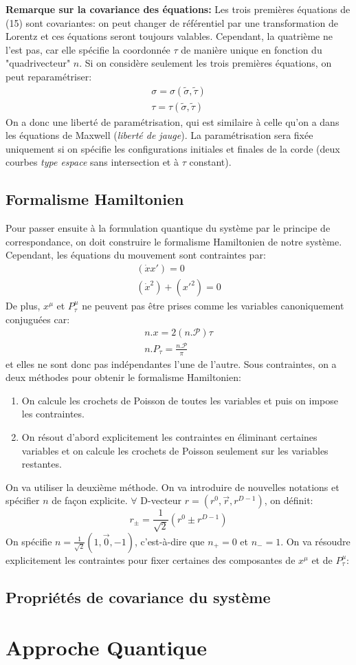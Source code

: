 \documentclass[a4paper,12pt]{article}
\def\xmu{x^\mu}
\begin{document}
\textbf{Remarque sur la covariance des équations:}
Les trois premières équations de (15) sont covariantes: on peut changer de référentiel par une transformation de Lorentz et ces équations seront toujours valables. Cependant, la quatrième ne l'est pas, car elle spécifie la coordonnée $\tau$ de manière unique en fonction du "quadrivecteur" $n$. 
Si on considère seulement les trois premières équations, on peut reparamétriser:
\begin{align}
\sigma=\sigma(\tilde{\sigma},\tilde{\tau})\\
\tau=\tau(\tilde{\sigma},\tilde{\tau})
\end{align}
On a donc une liberté de paramétrisation, qui est similaire à celle qu'on a dans les équations de Maxwell (\textit{liberté de jauge}). La paramétrisation sera fixée uniquement si on spécifie les configurations initiales et finales de la corde (deux courbes \textit{type espace} sans intersection et à $\tau$ constant).
\subsection{Formalisme Hamiltonien}
Pour passer ensuite à la formulation quantique du système par le principe de correspondance, on doit construire le formalisme Hamiltonien de notre système. Cependant, les équations du mouvement sont contraintes par:
\begin{align}
(\dot{x}x')=0\\
(\dot{x}^2)+(x'^2)=0
\end{align}
De plus, $\xmu$ et $P_\tau^\mu$ ne peuvent pas être prises comme les variables canoniquement conjuguées car:
\begin{align}
n.x=2(n.\mathcal{P})\tau\\
n.P_\tau=\frac{n.\mathcal{P}}{\pi}
\end{align}
et elles ne sont donc pas indépendantes l'une de l'autre. Sous contraintes, on a deux méthodes pour obtenir le formalisme Hamiltonien:
\begin{enumerate}
\item On calcule les crochets de Poisson de toutes les variables et puis on impose les contraintes.
\item On résout d'abord explicitement les contraintes en éliminant certaines variables et on calcule les crochets de Poisson seulement sur les variables restantes.
\end{enumerate} 
On va utiliser la deuxième méthode.
On va introduire de nouvelles notations et spécifier $n$ de façon explicite.
$\forall$ D-vecteur $r=(r^0,\vec{r},r^{D-1})$, on définit:
$$r_\pm=\frac{1}{\sqrt2}(r^0\pm r^{D-1})$$
On spécifie $n=\frac{1}{\sqrt2}(1,\vec{0},-1)$, c'est-à-dire que 
$n_+=0$ et $n_-=1$.
On va résoudre explicitement les contraintes pour fixer certaines des composantes de $\xmu$ et de $P_\tau^\mu$: 
\subsection{Propriétés de covariance du système}
\section{Approche Quantique}
\end{document}
